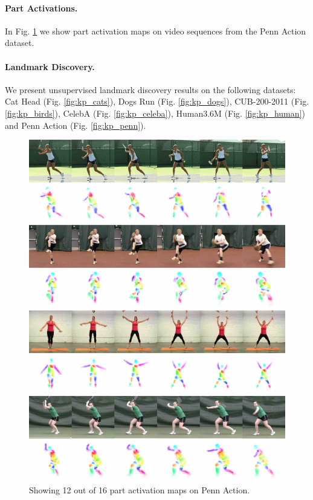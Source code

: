 \paragraph{Part Activations.} In Fig. \ref{fig:shape} we show part activation maps on video sequences from the Penn Action dataset.
\paragraph{Landmark Discovery.} We present unsupervised landmark discovery results on the following datasets: Cat Head (Fig. \ref{fig:kp_cats}), Dogs Run (Fig. \ref{fig:kp_dogs}), CUB-200-2011 (Fig. \ref{fig:kp_birds}), CelebA (Fig. \ref{fig:kp_celeba}), Human3.6M (Fig. \ref{fig:kp_human}) and Penn Action (Fig. \ref{fig:kp_penn}).

\begin{figure}[t]
	\centering
	\includegraphics[trim={0cm 0cm 0cm 0cm},clip, width=1.\linewidth]{fig/supp/shapes}
	\caption{Showing 12 out of 16 part activation maps on Penn Action.}
	\label{fig:shape}
\end{figure}

